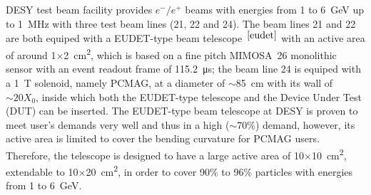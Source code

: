 DESY test beam facility provides $e^-/e^+$ beams with energies from 1 to \SI{6}{\GeV} up to \SI{1}{\MHz}
with three test beam lines (21, 22 and 24).
The beam lines 21 and 22 are both equiped with a EUDET-type beam telescope~$^{\cite{eudet}}$ with an active area of around 1$\times$\SI{2}{\square\centi\metre},
which is based on a fine pitch \uppercase{mimosa}~26 monolithic sensor with an event readout frame of \SI{115.2}{\micro\second};
the beam line 24 is equiped with a \SI{1}{\tesla} solenoid, namely PCMAG, at a diameter of $\sim$\SI{85}{\centi\metre} with its wall of $\sim20X_0$,
inside which both the EUDET-type telescope and the Device Under Test (DUT) can be inserted.
The EUDET-type beam telescope at DESY is proven to meet user's demands very well and thus in a high ($\sim$70\%) demand,
however, its active area is limited to cover the bending curvature for PCMAG users.
Therefore, the \lycoris telescope is designed to have a large active area of 10$\times$\SI{10}{\square\centi\metre}, extendable to 10$\times$\SI{20}{\square\centi\metre},
in order to cover 90\% to 96\% particles with energies from 1 to \SI{6}{\GeV}.


